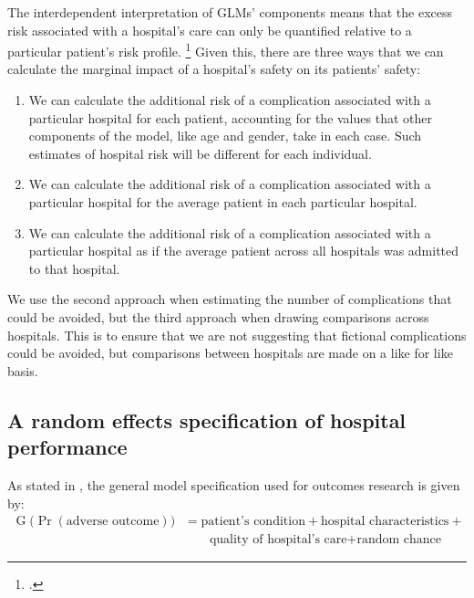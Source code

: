 \documentclass[submission]{grattan}
\begin{document}
The interdependent interpretation of GLMs' components means that the excess risk associated with a hospital's care can only be quantified relative to a particular patient's risk profile.%
	\footcite{Wooldridge-2010-Econometric-analysis-of-cross-section-and-panel-data}
Given this, there are three ways that we can calculate the marginal impact of a hospital's safety on its patients' safety:

\begin{enumerate}
\item
  We can calculate the additional risk of a complication associated with a particular hospital for each patient, accounting for the values that other components of the model, like age and gender, take in each case.
Such estimates of hospital risk will be different for each individual.
\item
  We can calculate the additional risk of a complication associated with a particular hospital for the average patient in each particular hospital.
\item
  We can calculate the additional risk of a complication associated with a particular hospital as if the average patient across all hospitals was admitted to that hospital.
\end{enumerate}

We use the second approach when estimating the number of complications that could be avoided, but the third approach when drawing comparisons across hospitals.
This is to ensure that we are not suggesting that fictional complications could be avoided, but comparisons between hospitals are made on a like for like basis.

\subsection{A random effects specification of hospital performance}\label{subsec:a-random-effects-specification-of-hospital-performance}

As stated in , the general model specification used for outcomes research is given by:
\begin{align*}
\operatorname{G}(\Pr{\left( \text{adverse outcome} \right))} & = \text{patient's condition} + \text{hospital characteristics} + {}\\
                                                              & \qquad\text{quality of hospital's care} + \text{random chance}
\end{align*}
\end{document}
